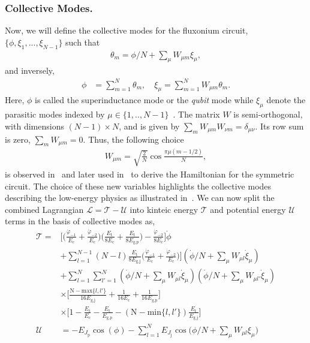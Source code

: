 \documentclass[%
reprint,
superscriptaddress,
 amsmath,amssymb,
 aps,
 prx,
longbibliography,
floatfix,
]{revtex4-2}
\begin{document}
\subsubsection{Collective Modes.} 
Now, we will define the collective modes for the fluxonium circuit, $\{\phi,\xi_1,...,\xi_{N-1}\}$ such that 
\begin{align}
    \theta_m=\phi/N+\sum_\mu W_{\mu m}\xi_\mu,
\end{align}
and inversely,
\begin{align}
    \phi&=\sum_{m=1}^N\theta_m,\quad \xi_\mu=\sum_{m=1}^N W_{\mu m}\theta_m.
\end{align}
Here, $\phi$ is called the superinductance mode or the \emph{qubit} mode while $\xi_\mu$ denote the parasitic modes indexed by $\mu\in\{1,..,N-1\}$~\cite{ferguson2013symmetries}. The matrix $W$ is semi-orthogonal, with dimensions $(N-1)\times N$, and is given by $\sum_m W_{\mu m}W_{\nu m}=\delta_{\mu \nu}$. Its row sum is zero, $\sum_mW_{\mu m}=0$. Thus, the following choice
\begin{align}
    W_{\mu m}=\sqrt{\frac{2}{N}}\cos{\frac{\pi\mu(m-1/2)}{N}},
\end{align}
is observed in~\cite{ferguson2013symmetries} and later used in~\cite{viola2015collective} to derive the Hamiltonian for the symmetric circuit.
The choice of these new variables highlights the collective modes describing the low-energy physics as illustrated in~\cite{catelani2011relaxation,koch2009charging,manucharyan2009fluxonium}. We can now split the combined Lagrangian $\mathcal{L}=\mathcal{T}-\mathcal{U}$ into kinteic energy $\mathcal{T}$ and potential energy $
\mathcal{U}$ terms in the basis of collective modes as,
\begin{align}
\mathcal{T}=&\Big[\Big(\frac{\dot{\varphi}_{-1}}{E_{\textrm{c}}}+\frac{\dot{\varphi}_{-2}}{E_{\textrm{c}}}\Big)\Big(\frac{E_{\textrm{t}}}{8E_{\textrm{c}}}+\frac{E_{\textrm{t}}}{8E_{\textrm{g,p}}}\Big)-\frac{\dot{\varphi}_{-2}}{8E_{\textrm{c}}}\Big]\dot{\phi}\nonumber\\&+\sum_{l=1}^{N-1}(N-l)\frac{E_{\textrm{t}}}{8E_{\textrm{g,j}}}\Big(\frac{\dot{\varphi}_{-1}}{E_{\textrm{c}}}+\frac{\dot{\varphi}_{-2}}{E_{\textrm{c}}}\Big)\Big](\dot{\phi}/N+\sum_\mu W_{\mu l}\dot{\xi}_\mu)\nonumber\\
  &+\sum_{l=1}^N\sum_{l'=1}^N(\dot{\phi}/N+\sum_\mu W_{\mu l}\dot{\xi}_\mu)(\dot{\phi}/N+\sum_\mu W_{\mu l'}\dot{\xi}_\mu)\nonumber\\
  &\times\Big[\frac{\textrm{N}-\text{max}\{l,l'\}}{16E_\textrm{g,j}}+\frac{1}{16E_\textrm{c}}+\frac{1}{16E_\textrm{g,p}}\Big]\nonumber\\&\times\Big[1-\frac{E_\textrm{t}}{E_\textrm{c}}-\frac{E_\textrm{t}}{E_\textrm{g,p}}-(\textrm{N}-\text{min}\{l,l'\})\frac{E_\textrm{t}}{E_\textrm{g,j}}\Big]\label{eq:kin-energy}\\
    \mathcal{U}&=-E_{J_\textrm{p}}\cos(\phi)-\sum_{l=1}^NE_{J_\textrm{j}}\cos\Big(\phi/N+\sum_\mu W_{\mu l}\xi_\mu\Big)\label{eq:pot-energy}
\end{align}
\end{document}
